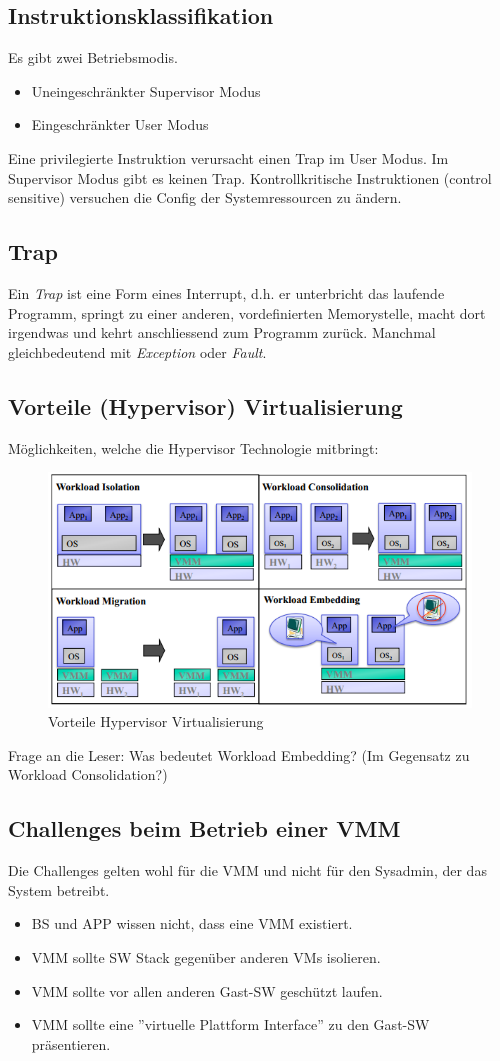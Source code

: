 \subsection{Instruktionsklassifikation}
Es gibt zwei Betriebsmodis.
\begin{itemize}
	\item Uneingeschränkter Supervisor Modus
	\item Eingeschränkter User Modus
\end{itemize}
Eine privilegierte Instruktion verursacht einen Trap im User Modus. Im Supervisor Modus gibt es keinen Trap. Kontrollkritische Instruktionen (control sensitive) versuchen die Config der Systemressourcen zu ändern.

\subsection{Trap}
Ein \textit{Trap} ist eine Form eines Interrupt, d.h. er unterbricht das laufende Programm, springt zu einer anderen, vordefinierten Memorystelle, macht dort irgendwas und kehrt anschliessend zum Programm zurück. Manchmal gleichbedeutend mit \textit{Exception} oder \textit{Fault}.

\subsection{Vorteile (Hypervisor) Virtualisierung}
Möglichkeiten, welche die Hypervisor Technologie mitbringt:
\begin{figure}[h!]
\centering
\includegraphics[width=0.7\linewidth]{fig/vorteile-hypervisor-virtualisierung}
\caption{Vorteile Hypervisor Virtualisierung}
\label{fig:vorteile-hypervisor-virtualisierung}
\end{figure}

Frage an die Leser: Was bedeutet Workload Embedding? (Im Gegensatz zu Workload Consolidation?)

\subsection{Challenges beim Betrieb einer VMM}
Die Challenges gelten wohl für die VMM und nicht für den Sysadmin, der das System betreibt.
\begin{itemize}
	\item BS und APP wissen nicht, dass eine VMM existiert.
	\item VMM sollte SW Stack gegenüber anderen VMs isolieren.
	\item VMM sollte vor allen anderen Gast-SW geschützt laufen.
	\item VMM sollte eine ''virtuelle Plattform Interface'' zu den Gast-SW präsentieren.
\end{itemize}

